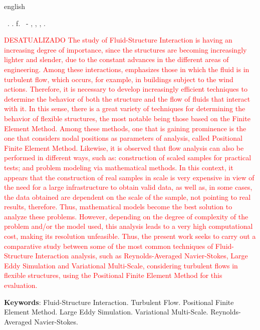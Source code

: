 \begin{resumo}[Abstract]
    \begin{otherlanguage*}{english}
        \begin{flushleft}
            \setlength{\absparsep}{0pt} %
            \SingleSpacing
            \Autorabr\ \textbf{\Title}.	\the\year. \pageref{LastPage}f.
            \Typeofwork\ - \Unidademin, \Universidade, \Local, \the\year.
        \end{flushleft}
        \OnehalfSpacing

        \textcolor{red}{
            DESATUALIZADO
            The study of Fluid-Structure Interaction is having an increasing degree of importance, since the structures are becoming increasingly lighter and slender, due to the constant advances in the different areas of engineering. Among these interactions, emphasizes those in which the fluid is in turbulent flow, which occurs, for example, in buildings subject to the wind actions. Therefore, it is necessary to develop increasingly efficient techniques to determine the behavior of both the structure and the flow of fluids that interact with it. In this sense, there is a great variety of techniques for determining the behavior of flexible structures, the most notable being those based on the Finite Element Method. Among these methods, one that is gaining prominence is the one that considers nodal positions as parameters of analysis, called Positional Finite Element Method. Likewise, it is observed that flow analysis can also be performed in different ways, such as: construction of scaled samples for practical tests; and problem modeling via mathematical methods. In this context, it appears that the construction of real samples in scale is very expensive in view of the need for a large infrastructure to obtain valid data, as well as, in some cases, the data obtained are dependent on the scale of the sample, not pointing to real results, therefore. Thus, mathematical models become the best solution to analyze these problems. However, depending on the degree of complexity of the problem and/or the model used, this analysis leads to a very high computational cost, making its resolution unfeasible. Thus, the present work seeks to carry out a comparative study between some of the most common techniques of Fluid-Structure Interaction analysis, such as Reynolds-Averaged Navier-Stokes, Large Eddy Simulation and Variational Multi-Scale, considering turbulent flows in flexible structures, using the Positional Finite Element Method for this evaluation.}

        \textbf{Keywords}: Fluid-Structure Interaction. Turbulent Flow. Positional Finite Element Method. Large Eddy Simulation. Variational Multi-Scale. Reynolds-Averaged Navier-Stokes.
    \end{otherlanguage*}
\end{resumo}